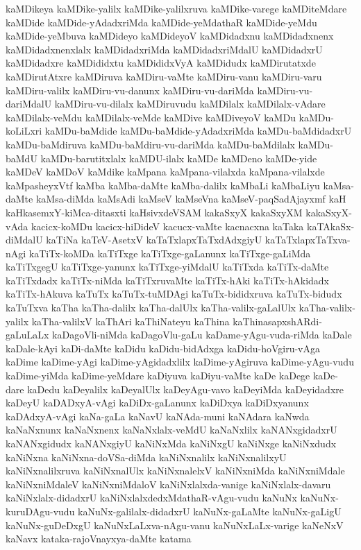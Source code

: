 {kaMDikeya
kaMDike-yalilx
kaMDike-yalilxruva
kaMDike-varege
kaMDiteMdare
kaMDide
kaMDide-yAdadxriMda
kaMDide-yeMdathaR
kaMDide-yeMdu
kaMDide-yeMbuva
kaMDideyo
kaMDideyoV
kaMDidadxnu
kaMDidadxnenx
kaMDidadxnenxlalx
kaMDidadxriMda
kaMDidadxriMdalU
kaMDidadxrU
kaMDidadxre
kaMDididxtu
kaMDididxVyA
kaMDidudx
kaMDirutatxde
kaMDirutAtxre
kaMDiruva
kaMDiru-vaMte
kaMDiru-vanu
kaMDiru-varu
kaMDiru-valilx
kaMDiru-vu-danunx
kaMDiru-vu-dariMda
kaMDiru-vu-dariMdalU
kaMDiru-vu-dilalx
kaMDiruvudu
kaMDilalx
kaMDilalx-vAdare
kaMDilalx-veMdu
kaMDilalx-veMde
kaMDive
kaMDiveyoV
kaMDu
kaMDu-koLiLxri
kaMDu-baMdide
kaMDu-baMdide-yAdadxriMda
kaMDu-baMdidadxrU
kaMDu-baMdiruva
kaMDu-baMdiru-vu-dariMda
kaMDu-baMdilalx
kaMDu-baMdU
kaMDu-barutitxlalx
kaMDU-ilalx
kaMDe
kaMDeno
kaMDe-yide
kaMDeV
kaMDoV
kaMdike
kaMpana
kaMpana-vilalxda
kaMpana-vilalxde
kaMpasheyxVtf
kaMba
kaMba-daMte
kaMba-dalilx
kaMbaLi
kaMbaLiyu
kaMsa-daMte
kaMsa-diMda
kaMsAdi
kaMseV
kaMseVna
kaMseV-paqSadAjayxmf
kaH
kaHkasemxY-kiMca-ditasxti
kaHsivxdeVSAM
kakaSxyX
kakaSxyXM
kakaSxyX-vAda
kacicx-koMDu
kacicx-hiDideV
kacucx-vaMte
kacnacxna
kaTaka
kaTAkaSx-diMdalU
kaTiNa
kaTeV-AsetxV
kaTaTxlapxTaTxdAdxgiyU
kaTaTxlapxTaTxva-nAgi
kaTiTx-koMDa
kaTiTxge
kaTiTxge-gaLanunx
kaTiTxge-gaLiMda
kaTiTxgegU
kaTiTxge-yanunx
kaTiTxge-yiMdalU
kaTiTxda
kaTiTx-daMte
kaTiTxdadx
kaTiTx-niMda
kaTiTxruvaMte
kaTiTx-hAki
kaTiTx-hAkidadx
kaTiTx-hAkuva
kaTuTx
kaTuTx-tuMDAgi
kaTuTx-bididxruva
kaTuTx-bidudx
kaTuTxva
kaTha
kaTha-dalilx
kaTha-dalUlx
kaTha-valilx-gaLalUlx
kaTha-valilx-yalilx
kaTha-valilxV
kaThAri
kaThiNateyu
kaThina
kaThinasapxshARdi-gaLuLaLx
kaDagoVli-niMda
kaDagoVlu-gaLu
kaDame-yAgu-vuda-riMda
kaDale
kaDale-kAyi
kaDi-daMte
kaDidu
kaDidu-bidAdxga
kaDidu-hoVgiru-vAga
kaDime
kaDime-yAgi
kaDime-yAgidadxlilx
kaDime-yAgiruva
kaDime-yAgu-vudu
kaDime-yiMda
kaDime-yeMdare
kaDiyuva
kaDiyu-vaMte
kaDe
kaDege
kaDe-dare
kaDedu
kaDeyalilx
kaDeyalUlx
kaDeyAgu-vavo
kaDeyiMda
kaDeyidadxre
kaDeyU
kaDADxyA-vAgi
kaDiDx-gaLanunx
kaDiDxya
kaDiDxyanunx
kaDAdxyA-vAgi
kaNa-gaLa
kaNavU
kaNAda-muni
kaNAdara
kaNwda
kaNaNxnunx
kaNaNxnenx
kaNaNxlalx-veMdU
kaNaNxlilx
kaNANxgidadxrU
kaNANxgidudx
kaNANxgiyU
kaNiNxMda
kaNiNxgU
kaNiNxge
kaNiNxdudx
kaNiNxna
kaNiNxna-doVSa-diMda
kaNiNxnalilx
kaNiNxnalilxyU
kaNiNxnalilxruva
kaNiNxnalUlx
kaNiNxnalelxV
kaNiNxniMda
kaNiNxniMdale
kaNiNxniMdaleV
kaNiNxniMdaloV
kaNiNxlalxda-vanige
kaNiNxlalx-davaru
kaNiNxlalx-didadxrU
kaNiNxlalxdedxMdathaR-vAgu-vudu
kaNuNx
kaNuNx-kuruDAgu-vudu
kaNuNx-galilalx-didadxrU
kaNuNx-gaLaMte
kaNuNx-gaLigU
kaNuNx-guDeDxgU
kaNuNxLaLxva-nAgu-vanu
kaNuNxLaLx-varige
kaNeNxV
kaNavx
kataka-rajoVnayxya-daMte
katama
}
